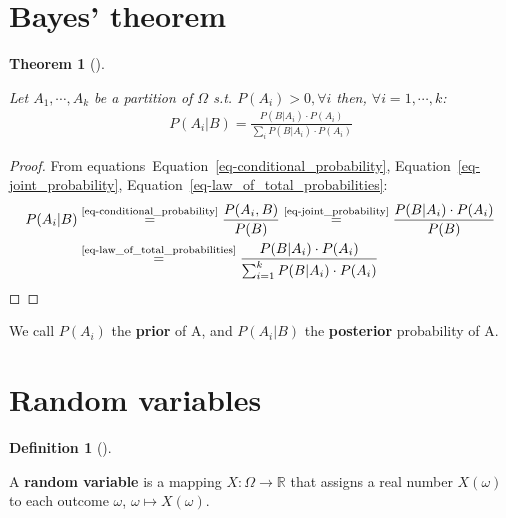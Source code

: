 \documentclass[
  letterpaper,
  12pt,
  british]{tufte-book}
\theoremstyle{plain}
\newtheorem{theorem}{Theorem}[chapter]
\theoremstyle{plain}
\theoremstyle{definition}
\newtheorem{definition}{Definition}[chapter]
\theoremstyle{remark}
\begin{document}
\hypertarget{sec-bayes_theorem}{%
\section{Bayes' theorem}\label{sec-bayes_theorem}}

\leavevmode{}%
\begin{theorem}[]\label{thm-bayes}

Let \(A_1, \cdots, A_k\) be a partition of \(\Omega\) s.t.
\(P(A_i)>0, \forall i\) then, \(\forall i=1, \cdots, k\): \begin{align}
        P(A_i|B)= \frac{P(B|A_i)\cdot P(A_i)}{\sum_i P(B|A_i)\cdot P(A_i)}
\end{align}

\end{theorem}

\begin{proof}

From
equations~Equation~\ref{eq-conditional_probability}, Equation~\ref{eq-joint_probability}, Equation~\ref{eq-law_of_total_probabilities}:
\begin{align}
        P(A_i|B)&\overset{\text{\ref{eq-conditional_probability}}}{=}\frac{P(A_i,B)}{P(B)} \overset{\text{\ref{eq-joint_probability}}}{=} \frac{P(B|A_i) \cdot P(A_i)}{P(B)}  \\
        &\overset{\text{\ref{eq-law_of_total_probabilities}}}{=}\frac{P(B|A_i)\cdot P(A_i)}{\sum_{i=1}^k P(B|A_i)\cdot P(A_i)}
\end{align} ◻

\end{proof}

We call \(P(A_i)\) the \textbf{prior} of A, and \(P(A_i|B)\) the
\textbf{posterior} probability of A.

\hypertarget{sec-random_variables}{%
\section{Random variables}\label{sec-random_variables}}

\leavevmode{}%
\begin{definition}[]\label{def-random_variable}

A \textbf{random variable} is a mapping
\(\mathit{X}:\Omega \to \mathbb{R}\) that assigns a real number
\(\mathit{X}(\omega)\) to each outcome \(\omega\),
\(\omega \mapsto \mathit{X}(\omega)\).

\end{definition}
\end{document}
